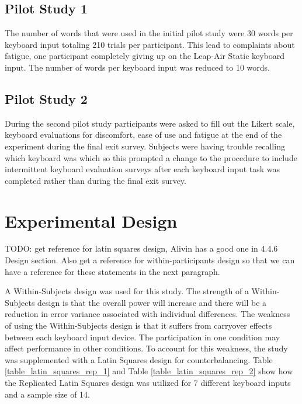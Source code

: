 \subsection{Pilot Study 1}

The number of words that were used in the initial pilot study were 30 words per keyboard input totaling 210 trials per participant. This lead to complaints about fatigue, one participant completely giving up on the Leap-Air Static keyboard input. The number of words per keyboard input was reduced to 10 words.

\subsection{Pilot Study 2}

During the second pilot study participants were asked to fill out the Likert scale, keyboard evaluations for discomfort, ease of use and fatigue at the end of the experiment during the final exit survey. Subjects were having trouble recalling which keyboard was which so this prompted a change to the procedure to include intermittent keyboard evaluation surveys after each keyboard input task was completed rather than during the final exit survey.

\section{Experimental Design} \label{experimental_design}

TODO: get reference for latin squares design, Alivin has a good one in 4.4.6 Design section. Also get a reference for within-participants design so that we can have a reference for these statements in the next paragraph.

A Within-Subjects design was used for this study. The strength of a Within-Subjects design is that the overall power will increase and there will be a reduction in error variance associated with individual differences. The weakness of using the Within-Subjects design is that it suffers from carryover effects between each keyboard input device. The participation in one condition may affect performance in other conditions. To account for this weakness, the study was supplemented with a Latin Squares design for counterbalancing. Table \ref{table_latin_squares_rep_1} and Table \ref{table_latin_squares_rep_2} show how the Replicated Latin Squares design was utilized for 7 different keyboard inputs and a sample size of 14.


